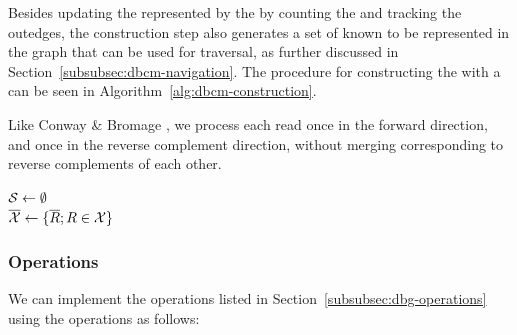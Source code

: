Besides updating the \dBG represented by the \dBCM by counting the  and tracking the outedges, the construction step also generates a set of  known to be represented in the graph that can be used for traversal, as further discussed in Section~\ref{subsubsec:dbcm-navigation}. The procedure for constructing the \dBG with a \dBCM can be seen in Algorithm~\ref{alg:dbcm-construction}.

Like Conway \& Bromage \cite{Conway2011}, we process each read once in the forward direction, and once in the reverse complement direction, without merging  corresponding to reverse complements of each other.

\begin{algorithm}
	\caption{$C.\mathit{construct}(\readset, t, n)$}\label{alg:dbcm-construction}
  $\strsetname{S} \gets \emptyset$\\
  $\overline{\readset} \gets \{\overline{R}; R \in \readset \}$\\
\end{algorithm}

\subsubsection{Operations}
\label{subsubsec:dbcm-operations}

We can implement the operations listed in Section~\ref{subsubsec:dbg-operations} using the \dBCM operations as follows:

